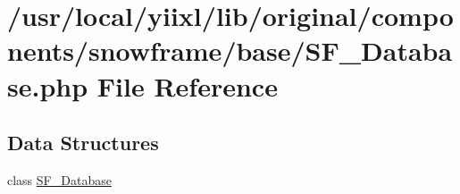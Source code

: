 \hypertarget{SF__Database_8php}{
\section{/usr/local/yiixl/lib/original/components/snowframe/base/SF\_\-Database.php File Reference}
\label{SF__Database_8php}
}
\subsection*{Data Structures}
\begin{DoxyCompactItemize}
\item 
class \hyperlink{classSF__Database}{SF\_\-Database}
\end{DoxyCompactItemize}
